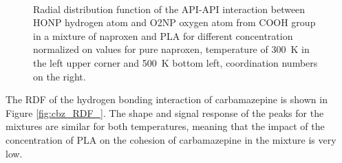 \begin{figure}[htb!]
	\centering
	\\
	\caption{Radial distribution function of the API-API interaction between HONP hydrogen atom and O2NP oxygen atom from COOH group in a mixture of naproxen and PLA for different concentration normalized on values for pure naproxen, temperature of 300~K in the left upper corner and 500~K bottom left, coordination numbers on the right.}
	\label{fig:nap_RDF_}
\end{figure}

The RDF of the hydrogen bonding interaction of carbamazepine is shown in Figure \ref{fig:cbz_RDF_}. The shape and signal response of the peaks for the mixtures are similar for both temperatures, meaning that the impact of the concentration of PLA on the cohesion of carbamazepine in the mixture is very low. 

